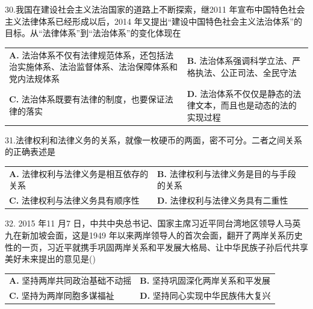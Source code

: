 \documentclass[UTF8,11pt]{ctexart}
\begin{document}
30.我国在建设社会主义法治国家的道路上不断探索，继2011 年宣布中国特色社会主义法律体系已经形成以后，2014 年又提出“建设中国特色社会主义法治体系”的目标。从“法律体系”到“法治体系”的变化体现在


\begin{center}\begin{tabular}{>{\raggedright\arraybackslash}p{\dimexpr(\linewidth-4\tabcolsep)/2\relax}>{\raggedright\arraybackslash}p{\dimexpr(\linewidth-4\tabcolsep)/2\relax}}
\textbf{A.} 法治体系不仅有法律规范体系，还包括法治实施体系、法治监督体系、法治保障体系和党内法规体系 & \textbf{B.} 法治体系强调科学立法、严格执法、公正司法、全民守法\\[.35em]
\textbf{C.} 法治体系既要有法律的制度，也要保证法律的落实 & \textbf{D.} 法治体系不仅仅是静态的法律文本，而且也是动态的法的实现过程\\[.35em]\end{tabular}\end{center}

31.法律权利和法律义务的关系，就像一枚硬币的两面，密不可分。二者之间关系的正确表述是


\begin{center}\begin{tabular}{>{\raggedright\arraybackslash}p{\dimexpr(\linewidth-4\tabcolsep)/2\relax}>{\raggedright\arraybackslash}p{\dimexpr(\linewidth-4\tabcolsep)/2\relax}}
\textbf{A.} 法律权利与法律义务是相互依存的关系 & \textbf{B.} 法律权利与法律义务是目的与手段的关系\\[.35em]
\textbf{C.} 法律权利与法律义务具有顺序性 & \textbf{D.} 法律权利与法律义务具有二重性\\[.35em]\end{tabular}\end{center}

32. 2015 年11 月7 日，中共中央总书记、国家主席习近平同台湾地区领导人马英九在新加坡会面，这是1949 年以来两岸领导人的首次会面，翻开了两岸关系历史性的一页，习近平就携手巩固两岸关系和平发展大格局、让中华民族子孙后代共享美好未来提出的意见是()


\begin{center}\begin{tabular}{>{\raggedright\arraybackslash}p{\dimexpr(\linewidth-4\tabcolsep)/2\relax}>{\raggedright\arraybackslash}p{\dimexpr(\linewidth-4\tabcolsep)/2\relax}}
\textbf{A.} 坚持两岸共同政治基础不动摇 & \textbf{B.} 坚持巩固深化两岸关系和平发展\\[.35em]
\textbf{C.} 坚持为两岸同胞多谋福祉 & \textbf{D.} 坚持同心实现中华民族伟大复兴\\[.35em]\end{tabular}\end{center}
\end{document}
